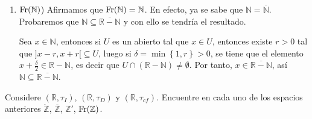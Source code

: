 \documentclass[12pt]{report}
\theoremstyle{largebreak}
\newcommand{\Int}[1]{\ensuremath{\mathring{#1}}}
\newcommand{\Cls}[1]{\ensuremath{\overline{#1}}}
\newcommand{\Fr}[1]{\ensuremath{\textup{Fr}(#1)}}
\begin{document}
\begin{sol}
\begin{enumerate}
            \item $\Fr{\mathbb{N}}$) Afirmamos que $\Fr{\mathbb{N}}=\mathbb{N}$. En efecto, ya se sabe que $\mathbb{N}=\Cls{\mathbb{N}}$. Probaremos que $\mathbb{N}\subseteq\Cls{\mathbb{R}-\mathbb{N}}$ y con ello se tendría el resultado. 
            
            Sea $x\in\mathbb{N}$, entonces si $U$ es un abierto tal que $x\in U$, entonces existe $r>0$ tal que $]x-r,x+r[\subseteq U$, luego si $\delta=\min\left\{1,r\right\}>0$, se tiene que el elemento $x+\frac{\delta}{2}\in\mathbb{R}-\mathbb{N}$, es decir que $U\cap(\mathbb{R}-\mathbb{N})\neq\emptyset$. Por tanto, $x\in\Cls{\mathbb{R}-\mathbb{N}}$, así $\mathbb{N}\subseteq\Cls{\mathbb{R}-\mathbb{N}}$.
        \end{enumerate}
    \end{sol}

    \begin{excer}
        Considere $(\mathbb{R},\tau_I)$, $(\mathbb{R},\tau_D)$ y $(\mathbb{R},\tau_{cf})$. Encuentre en cada uno de los espacios anteriores $\Int{\mathbb{Z}}$, $\Cls{\mathbb{Z}}$, $\mathbb{Z}'$, $\Fr{\mathbb{Z}}$.
    \end{excer}
\end{document}
